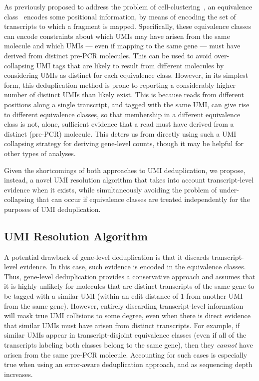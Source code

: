 As previously proposed to address the problem of cell-clustering~\citep{tcc}, an equivalence class~\citep{mmseq, mezlini2013ireckon, sailfish, kallisto, salmon, rnaskim, fleximer} encodes some positional information, by means of encoding the set of transcripts to which a fragment is mapped. Specifically, these equivalence classes can encode constraints about which UMIs may have arisen from the same molecule and which UMIs --- even if mapping to the same gene --- must have derived from distinct pre-PCR molecules. This can be used to avoid over-collapsing UMI tags that are likely to result from different molecules by considering UMIs as distinct for each equivalence class. However, in its simplest form, this deduplication method is prone to reporting a considerably higher number of distinct UMIs than likely exist. This is because reads from different positions along a single transcript, and tagged with the same UMI, can give rise to different equivalence classes, so that membership in a different equivalence class is not, alone, sufficient evidence that a read must have derived from a distinct (pre-PCR) molecule. This deters us from directly using such a UMI collapsing strategy for deriving gene-level counts, though it may be helpful for other types of analyses.  

Given the shortcomings of both approaches to UMI deduplication, we propose, instead, a novel UMI resolution algorithm that takes into account transcript-level evidence when it exists, while
simultaneously avoiding the problem of under-collapsing that can occur if equivalence classes are treated independently for the purposes of UMI deduplication.

\subsection{UMI Resolution Algorithm}
\label{sec:collision_algo}
A potential drawback of gene-level deduplication is that it discards transcript-level evidence. In this case, such evidence is encoded in the equivalence classes. Thus, gene-level deduplication provides a conservative approach and assumes that it is highly unlikely for molecules that are distinct transcripts of the same gene to be tagged with a similar UMI (within an edit distance of 1 from another UMI from the same gene). However, entirely discarding transcript-level information will mask true UMI collisions to some degree, even when there is direct evidence that similar UMIs must have arisen from distinct transcripts.  For example, if similar UMIs appear in transcript-disjoint equivalence classes (even if all of the transcripts labeling both classes belong to the same gene), then they \emph{cannot} have arisen from the same pre-PCR molecule. Accounting for such cases is especially true when using an error-aware deduplication approach, and as sequencing depth increases.

